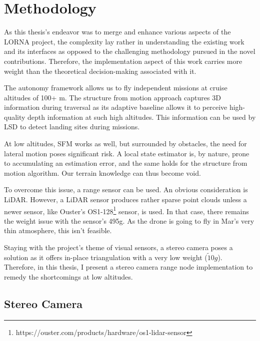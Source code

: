 \chapter{Methodology}
\label{sec:methodology}

As this thesis's endeavor was to merge and enhance various aspects of the LORNA project, the complexity lay rather in understanding the existing work and its interfaces as opposed to the challenging methodology pursued in the novel contributions. Therefore, the implementation aspect of this work carries more weight than the theoretical decision-making associated with it.

The autonomy framework\citep{Autonomy} allows us to fly independent missions at cruise altitudes of 100+ m. The structure from motion approach captures 3D information during traversal as its adaptive baseline allows it to perceive high-quality depth information at such high altitudes. This information can be used by LSD to detect landing sites during missions. 

At low altitudes, SFM works as well, but surrounded by obstacles, the need for lateral motion poses significant risk. A local state estimator is, by nature, prone to accumulating an estimation error, and the same holds for the structure from motion algorithm. Our terrain knowledge can thus become void. 

To overcome this issue, a range sensor can be used. An obvious consideration is LiDAR. However, a LiDAR sensor produces rather sparse point clouds unless a newer sensor, like Ouster's OS1-128\footnote[1]{https://ouster.com/products/hardware/os1-lidar-sensor} sensor, is used. In that case, there remains the weight issue with the sensor's 495g. As the drone is going to fly in Mar's very thin atmosphere, this isn't feasible. 

Staying with the project's theme of visual sensors, a stereo camera poses a solution as it offers in-place triangulation with a very low weight ($\tilde 10g$). Therefore, in this thesis, I present a stereo camera range node implementation to remedy the shortcomings at low altitudes.


\section{Stereo Camera}\label{sec:stereo_methodology}

